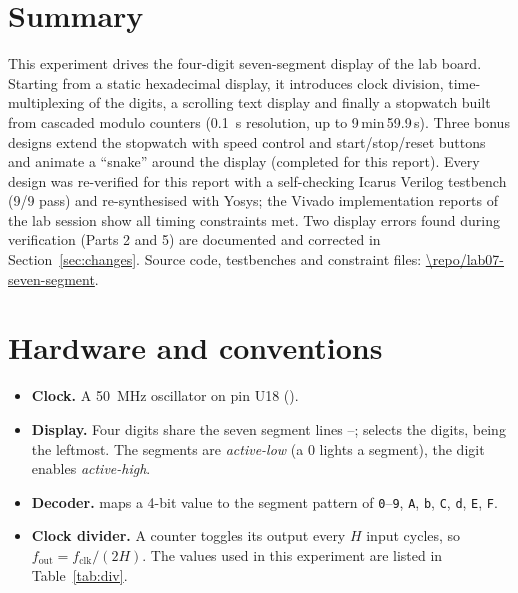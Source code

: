 
\newcommand{\ReportShortTitle}{Experiment 7 -- Seven-segment multiplexing and a stopwatch}


\section*{Summary}
This experiment drives the four-digit seven-segment display of the lab board. Starting from a static
hexadecimal display, it introduces clock division, time-multiplexing of the digits, a scrolling text
display and finally a stopwatch built from cascaded modulo counters (\SI{0.1}{s} resolution, up to
9\,min\,59.9\,s). Three bonus designs extend the stopwatch with speed control and start/stop/reset buttons
and animate a ``snake'' around the display (completed for this report). Every design was re-verified for this report with a
self-checking Icarus Verilog testbench (9/9 pass) and re-synthesised with Yosys; the Vivado
implementation reports of the lab session show all timing constraints met. Two display errors found
during verification (Parts 2 and 5) are documented and corrected in Section~\ref{sec:changes}.
Source code, testbenches and constraint files: \url{\repo/lab07-seven-segment}.

\section{Hardware and conventions}
\begin{itemize}
  \item \textbf{Clock.} A \SI{50}{MHz} oscillator on pin U18 ().
  \item \textbf{Display.} Four digits share the seven segment lines --; 
        selects the digits,  being the leftmost. The segments are \emph{active-low}
        (a 0 lights a segment), the digit enables \emph{active-high}.
  \item \textbf{Decoder.}  maps a 4-bit value to the segment pattern of
        \texttt{0}--\texttt{9}, \texttt{A}, \texttt{b}, \texttt{C}, \texttt{d}, \texttt{E}, \texttt{F}.
  \item \textbf{Clock divider.} A counter toggles its output every $H$ input cycles, so
        $f_\text{out} = f_\text{clk}/(2H)$. The values used in this experiment are listed in Table~\ref{tab:div}.
\end{itemize}

